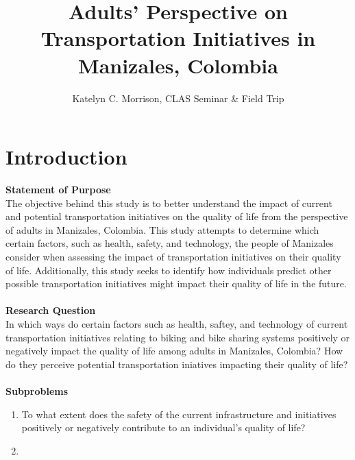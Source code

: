 \documentclass[12pt]{article}
\title{\vspace{-2cm}Adults' Perspective on Transportation Initiatives in Manizales, Colombia}
\author{
    Katelyn C. Morrison,
    CLAS Seminar \& Field Trip
}
\date{}
\begin{document}
\maketitle

\section[]{Introduction}
\textbf{Statement of Purpose}\\
The objective behind this study is to better understand the impact of current and potential
transportation initiatives on the quality of life from the perspective of adults in Manizales,
Colombia. This study attempts to determine which certain factors, such as health, safety, and
technology, the people of Manizales consider when assessing the impact of transportation initiatives
on their quality of life. Additionally, this study seeks to identify how individuals predict other
possible transportation initiatives might impact their quality of life in the future.\\
\\
\textbf{Research Question}\\
In which ways do certain factors such as health, saftey, and technology of current transportation
initiatives relating to biking and bike sharing systems positively or negatively impact the
quality of life among adults in Manizales, Colombia? How do they perceive potential transportation
iniatives impacting their quality of life?\\
\\
\textbf{Subproblems}
\begin{enumerate}
    \item To what extent does the safety of the current infrastructure and initiatives positively or negatively contribute to an individual's quality of life?
    \item 
\end{enumerate}
\end{document}

